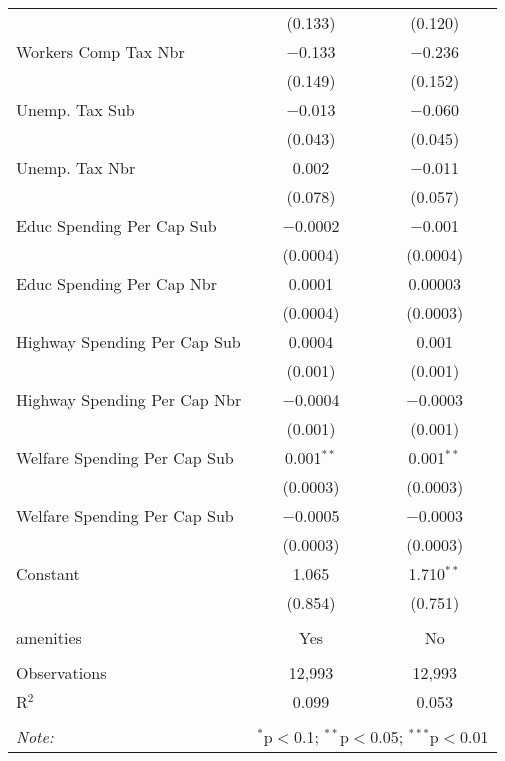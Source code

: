 \begin{table}[!htbp]
\begin{tabular}{@{\extracolsep{5pt}}lcc}
  & (0.133) & (0.120) \\ 
  Workers Comp Tax Nbr & $-$0.133 & $-$0.236 \\ 
  & (0.149) & (0.152) \\ 
  Unemp. Tax Sub & $-$0.013 & $-$0.060 \\ 
  & (0.043) & (0.045) \\ 
  Unemp. Tax Nbr & 0.002 & $-$0.011 \\ 
  & (0.078) & (0.057) \\ 
  Educ Spending Per Cap Sub & $-$0.0002 & $-$0.001 \\ 
  & (0.0004) & (0.0004) \\ 
  Educ Spending Per Cap Nbr & 0.0001 & 0.00003 \\ 
  & (0.0004) & (0.0003) \\ 
  Highway Spending Per Cap Sub & 0.0004 & 0.001 \\ 
  & (0.001) & (0.001) \\ 
  Highway Spending Per Cap Nbr & $-$0.0004 & $-$0.0003 \\ 
  & (0.001) & (0.001) \\ 
  Welfare Spending Per Cap Sub & 0.001$^{**}$ & 0.001$^{**}$ \\ 
  & (0.0003) & (0.0003) \\ 
  Welfare Spending Per Cap Sub & $-$0.0005 & $-$0.0003 \\ 
  & (0.0003) & (0.0003) \\ 
  Constant & 1.065 & 1.710$^{**}$ \\ 
  & (0.854) & (0.751) \\ 
 \hline \\[-1.8ex] 
amenities & Yes & No \\ 
\hline \\[-1.8ex] 
Observations & 12,993 & 12,993 \\ 
R$^{2}$ & 0.099 & 0.053 \\ 
\hline 
\hline \\[-1.8ex] 
\textit{Note:}  & \multicolumn{2}{r}{$^{*}$p$<$0.1; $^{**}$p$<$0.05; $^{***}$p$<$0.01} \\ 
\end{tabular} 
\end{table} 
